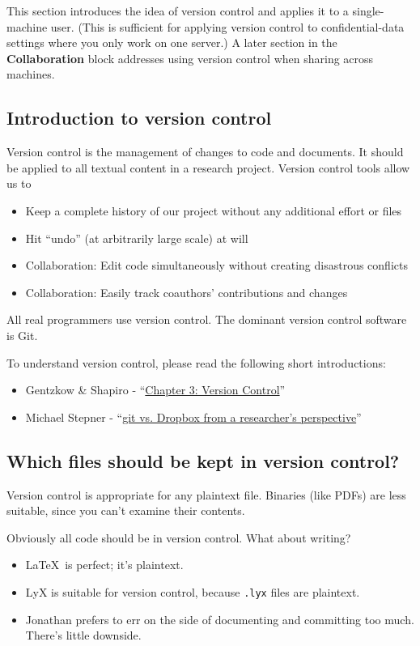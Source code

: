 This section introduces the idea of version control and applies it to a single-machine user.
(This is sufficient for applying version control to confidential-data settings where you only work on one server.)
A later section in the \textbf{Collaboration} block addresses using version control when sharing across machines.

\subsection{Introduction to version control}

Version control is the management of changes to code and documents.
It should be applied to all textual content in a research project.
Version control tools allow us to
\begin{itemize}
	\item Keep a complete history of our project without any additional effort or files
	\item Hit ``undo'' (at arbitrarily large scale) at will
	\item Collaboration: Edit code simultaneously without creating disastrous conflicts
	\item Collaboration: Easily track coauthors' contributions and changes
\end{itemize}
All real programmers use version control. The dominant version control software is Git.

To understand version control, please read the following short introductions:
\begin{itemize}
	\item Gentzkow \& Shapiro - ``\href{https://web.stanford.edu/~gentzkow/research/CodeAndData.pdf}{Chapter 3: Version Control}''
	\item Michael Stepner - ``\href{https://michaelstepner.com/blog/git-vs-dropbox}{git vs. Dropbox from a researcher's perspective}''
\end{itemize}

\subsection{Which files should be kept in version control?}

Version control is appropriate for any plaintext file.
Binaries (like PDFs) are less suitable, since you can't examine their contents.

Obviously all code should be in version control. What about writing?
\begin{itemize}
	\item \LaTeX\ is perfect; it's plaintext.
	\item LyX is suitable for version control, because \texttt{.lyx} files are plaintext. 
	\item Jonathan prefers to err on the side of documenting and committing too much. There's little downside.
\end{itemize}

